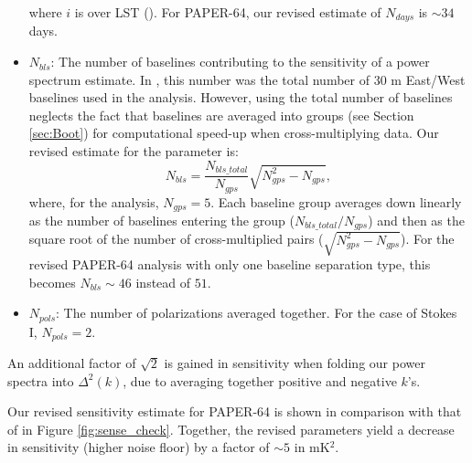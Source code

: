 \documentclass[preprint2,numberedappendix,tighten]{aastex6}  %
\begin{document}
\begin{itemize}
\begin{equation}
 \end{equation}
\noindent where $i$ is over LST (\citealt{jacobs_et_al2015}). For PAPER-64, our revised estimate of $N_{days}$ is $\sim34$ 
days.
\item $N_{bls}$: The number of baselines contributing to the sensitivity of a power spectrum estimate. In , this number was 
the total number of $30$ m East/West baselines used in the analysis. However, using the total number of baselines neglects 
the fact that baselines are averaged into groups (see Section \ref{sec:Boot}) for computational speed-up when cross-multiplying data. Our revised estimate for the parameter is:
\begin{equation}
N_{bls} = \frac{N_{bls\_total}}{N_{gps}}\sqrt{N_{gps}^{2}-N_{gps}},
\end{equation}
\noindent where, for the  analysis, $N_{gps} = 5$. Each baseline group averages down linearly as the number of baselines 
entering the group ($N_{bls\_total}/N_{gps}$) and then as the square root of the number of cross-multiplied pairs ($\sqrt{N_{gps}^{2} - 
N_{gps}}$). For the revised PAPER-64 analysis with only one baseline separation type, this becomes $N_{bls} \sim 46$ instead 
of $51$. 
\item $N_{pols}$: The number of polarizations averaged together. For the case of Stokes I, $N_{pols}=2$.
\end{itemize}

An additional factor of $\sqrt{2}$ is gained in sensitivity when folding our power spectra into $\Delta^{2}(k)$, due to averaging 
together positive and negative $k$'s. 

Our revised sensitivity estimate for PAPER-64 is shown in comparison with that of  in Figure \ref{fig:sense_check}. 
Together, the revised parameters yield a decrease in sensitivity (higher noise floor) by a factor of $\sim5$ in mK$^{2}$. 
\end{document}
